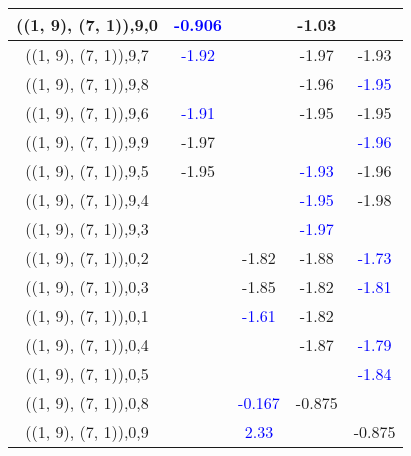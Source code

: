 \documentclass{article}
\begin{document}
\begin{center}
\begin{longtable}{|c|c|c|c|c|}
        	\hline
        	((1, 9), (7, 1)),9,0& \textcolor{blue}{-0.906}&&-1.03&\\
        	\hline
        	((1, 9), (7, 1)),9,7& \textcolor{blue}{-1.92}&&-1.97&-1.93\\
        	\hline
        	((1, 9), (7, 1)),9,8&&&-1.96& \textcolor{blue}{-1.95}\\
        	\hline
        	((1, 9), (7, 1)),9,6& \textcolor{blue}{-1.91}&&-1.95&-1.95\\
        	\hline
        	((1, 9), (7, 1)),9,9&-1.97&&& \textcolor{blue}{-1.96}\\
        	\hline
        	((1, 9), (7, 1)),9,5&-1.95&& \textcolor{blue}{-1.93}&-1.96\\
        	\hline
        	((1, 9), (7, 1)),9,4&&& \textcolor{blue}{-1.95}&-1.98\\
        	\hline
        	((1, 9), (7, 1)),9,3&&& \textcolor{blue}{-1.97}&\\
        	\hline
        	((1, 9), (7, 1)),0,2&&-1.82&-1.88& \textcolor{blue}{-1.73}\\
        	\hline
        	((1, 9), (7, 1)),0,3&&-1.85&-1.82& \textcolor{blue}{-1.81}\\
        	\hline
        	((1, 9), (7, 1)),0,1&& \textcolor{blue}{-1.61}&-1.82&\\
        	\hline
        	((1, 9), (7, 1)),0,4&&&-1.87& \textcolor{blue}{-1.79}\\
        	\hline
        	((1, 9), (7, 1)),0,5&&&& \textcolor{blue}{-1.84}\\
        	\hline
        	((1, 9), (7, 1)),0,8&& \textcolor{blue}{-0.167}&-0.875&\\
        	\hline
        	((1, 9), (7, 1)),0,9&& \textcolor{blue}{2.33}&&-0.875\\
        	\hline
        \end{longtable}
	\end{center}
\end{document}
